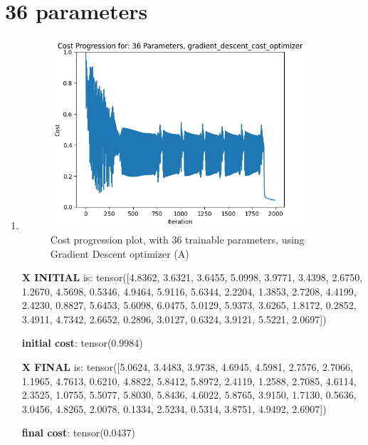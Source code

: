 \documentclass[inscr,ack,preface]{diphdthesis}
\begin{document}
\section{36 parameters}

\begin{enumerate}[label=\textbf{\Alph*.}]
    \item \textbf{  }
    
    \begin{figure}[H]
        \centering
        \includegraphics[width=0.9\textwidth]{36_08.png}
        \caption{Cost progression plot, with 36 trainable parameters, using Gradient Descent optimizer (A)} 
        \label{fig:fig4}
    \end{figure}
    
    \textbf{X INITIAL}  is:
    tensor([4.8362, 3.6321, 3.6455, 5.0998, 3.9771, 3.4398, 2.6750, 1.2670, 4.5698,
            0.5346, 4.9464, 5.9116, 5.6344, 2.2204, 1.3853, 2.7208, 4.4199, 2.4230,
            0.8827, 5.6453, 5.6098, 6.0475, 5.0129, 5.9373, 3.6265, 1.8172, 0.2852,
            3.4911, 4.7342, 2.6652, 0.2896, 3.0127, 0.6324, 3.9121, 5.5221, 2.0697])
            
    \textbf{initial cost}: tensor(0.9984)
    
    \textbf{X FINAL} is:
    tensor([5.0624, 3.4483, 3.9738, 4.6945, 4.5981, 2.7576, 2.7066, 1.1965, 4.7613,
            0.6210, 4.8822, 5.8412, 5.8972, 2.4119, 1.2588, 2.7085, 4.6114, 2.3525,
            1.0755, 5.5077, 5.8030, 5.8436, 4.6022, 5.8765, 3.9150, 1.7130, 0.5636,
            3.0456, 4.8265, 2.0078, 0.1334, 2.5234, 0.5314, 3.8751, 4.9492, 2.6907])
    
    \textbf{final cost}: tensor(0.0437)
    

\end{enumerate}
\end{document}
